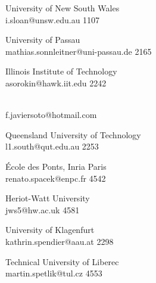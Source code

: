 \begin{multicols}{2}
 {University of New South Wales\\}%
 {i.sloan@unsw.edu.au}%
 {1107} %
 {} %
 {} %
 {} %
 {} %

 {University of Passau\\}%
 {mathias.sonnleitner@uni-passau.de}%
 {2165} %
 {} %
 {} %
 {} %
 {} %

 {Illinois Institute of Technology\\}%
 {asorokin@hawk.iit.edu}%
 {2242} %
 {} %
 {} %
 {} %
 {} %

 {\ \\}%
 {f.javiersoto@hotmail.com}%
 {} %
 {} %
 {} %
 {} %
 {} %

 {Queensland University of Technology\\}%
 {l1.south@qut.edu.au}%
 {2253} %
 {} %
 {} %
 {} %
 {} %

 {\'{E}cole des Ponts, Inria Paris\\}%
 {renato.spacek@enpc.fr}%
 {4542} %
 {} %
 {} %
 {} %
 {} %

 {Heriot-Watt University\\}%
 {jws5@hw.ac.uk}%
 {4581} %
 {} %
 {} %
 {} %
 {} %

 {University of Klagenfurt\\}%
 {kathrin.spendier@aau.at}%
 {2298} %
 {} %
 {} %
 {} %
 {} %

 {Technical University of Liberec\\}%
 {martin.spetlik@tul.cz}%
 {4553} %
 {} %
 {} %
 {} %
 {} %


\end{multicols}
